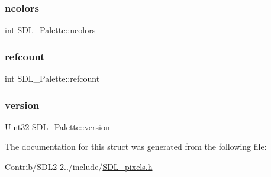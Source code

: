 \subsubsection{\texorpdfstring{ncolors}{ncolors}}
{\footnotesize\ttfamily int S\+D\+L\+\_\+\+Palette\+::ncolors}

\mbox{\label{struct_s_d_l___palette_a35c667737f883f973bb0a8dea143b08d}} 
\subsubsection{\texorpdfstring{refcount}{refcount}}
{\footnotesize\ttfamily int S\+D\+L\+\_\+\+Palette\+::refcount}

\mbox{\label{struct_s_d_l___palette_a5b8d45519f6850a32f13f1602ce37a8e}} 
\subsubsection{\texorpdfstring{version}{version}}
{\footnotesize\ttfamily \mbox{\hyperlink{_s_d_l__stdinc_8h_add440eff171ea5f55cb00c4a9ab8672d}{Uint32}} S\+D\+L\+\_\+\+Palette\+::version}



The documentation for this struct was generated from the following file\+:\begin{DoxyCompactItemize}
\item 
Contrib/\+S\+D\+L2-\/2../include/\mbox{\hyperlink{_s_d_l__pixels_8h}{S\+D\+L\+\_\+pixels.\+h}}\end{DoxyCompactItemize}
